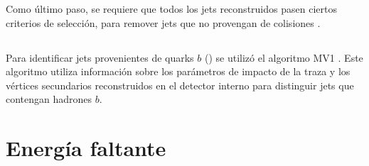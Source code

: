 Como último paso, se requiere que todos los jets reconstruidos pasen ciertos
criterios de selección, para remover jets que no provengan de colisiones \cite{Aad:2010ad,ATLAS-CONF-2010-038}.



\subsection{\bjets}
\label{sec:bjet_obj}



Para identificar jets provenientes de quarks $b$ (\bjets) se utilizó el
algoritmo MV1 \cite{ATLAS-CONF-2014-046,btagging}.
Este algoritmo utiliza
información sobre los parámetros de impacto de la traza y los vértices
secundarios reconstruidos en el detector interno para distinguir jets que
contengan hadrones $b$.



\section{Energía faltante}
\label{sec:met_obj}

